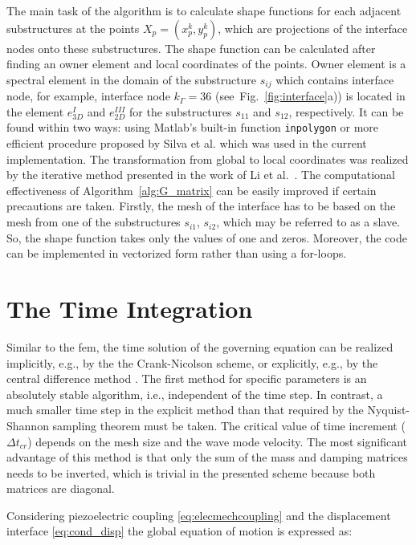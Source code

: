 \documentclass[11pt,a4paper,final]{report}
\begin{document}
The main task of the algorithm is to calculate shape functions for each adjacent substructures at the points \(X_p=(x_p^k,y_p^k)\), which are projections of the interface nodes onto these substructures.
The shape function can be calculated after finding an owner element and local coordinates of the points.
Owner element is a spectral element in the domain of the substructure \(s_{ij}\) which contains interface node, for example, interface node \(k_\Gamma=36\) (see~Fig.~\ref{fig:interface}a)) is located in the element \(e^{I}_{3D}\) and \(e^{III}_{2D}\) for the substructures \(s_{11}\) and \(s_{12}\), respectively.
It can be found within two ways: using Matlab's built-in function \verb+inpolygon+ or more efficient procedure proposed by Silva et al. \cite{silva2009exact} which was used in the current implementation.
The transformation from global to local coordinates was realized by the iterative method presented in the work of Li et al.~\cite{li2014efficient}.
The computational effectiveness of Algorithm~\ref{alg:G_matrix} can be easily improved if certain precautions are taken.
Firstly, the mesh of the interface has to be based on the mesh from one of the substructures \(s_{i1}\), \(s_{i2}\), which may be referred to as a slave.
So, the shape function takes only the values of one and zeros.
Moreover, the code can be implemented in vectorized form rather than using a for-loops. \section{The Time Integration}
\label{sec:time}

Similar to the \ac{fem}, the time solution of the governing equation can be realized implicitly, e.g., by the the Crank-Nicolson
scheme, or explicitly, e.g., by the central difference method \cite{bathe2006finite}.
The first method for specific parameters is an absolutely stable algorithm, i.e., independent of the time step.
In contrast, a much smaller time step in the explicit method than that required by the Nyquist-Shannon sampling theorem must be taken.
The critical value of time increment (\(\Delta t_{cr}\)) depends on the mesh size and the wave mode velocity.
The most significant advantage of this method is that only the sum of the mass and damping matrices needs to be inverted, which is trivial in the presented scheme because both matrices are diagonal.

Considering piezoelectric coupling \ref{eq:elecmechcoupling} and the displacement interface \ref{eq:cond_disp} the global equation of motion is expressed as:
\end{document}
